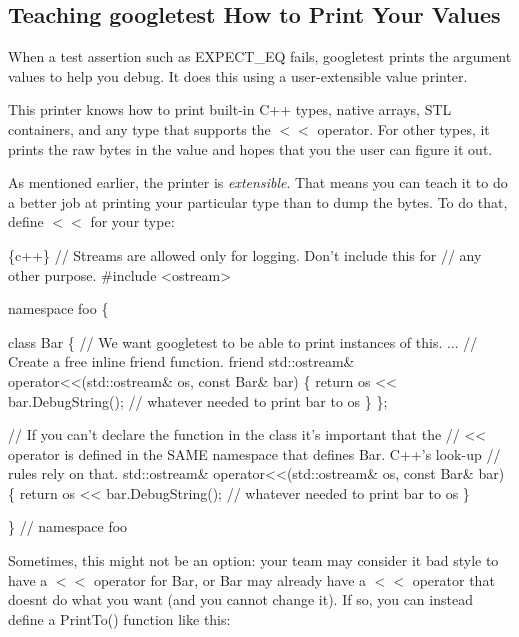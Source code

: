 \subsection*{Teaching googletest How to Print Your Values}

When a test assertion such as {\ttfamily E\+X\+P\+E\+C\+T\+\_\+\+EQ} fails, googletest prints the argument values to help you debug. It does this using a user-\/extensible value printer.

This printer knows how to print built-\/in C++ types, native arrays, S\+TL containers, and any type that supports the {\ttfamily $<$$<$} operator. For other types, it prints the raw bytes in the value and hopes that you the user can figure it out.

As mentioned earlier, the printer is {\itshape extensible}. That means you can teach it to do a better job at printing your particular type than to dump the bytes. To do that, define {\ttfamily $<$$<$} for your type\+:


\begin{DoxyCode}
\{c++\}
// Streams are allowed only for logging.  Don't include this for
// any other purpose.
#include <ostream>

namespace foo \{

class Bar \{  // We want googletest to be able to print instances of this.
...
  // Create a free inline friend function.
  friend std::ostream& operator<<(std::ostream& os, const Bar& bar) \{
    return os << bar.DebugString();  // whatever needed to print bar to os
  \}
\};

// If you can't declare the function in the class it's important that the
// << operator is defined in the SAME namespace that defines Bar.  C++'s look-up
// rules rely on that.
std::ostream& operator<<(std::ostream& os, const Bar& bar) \{
  return os << bar.DebugString();  // whatever needed to print bar to os
\}

\}  // namespace foo
\end{DoxyCode}


Sometimes, this might not be an option\+: your team may consider it bad style to have a {\ttfamily $<$$<$} operator for {\ttfamily Bar}, or {\ttfamily Bar} may already have a {\ttfamily $<$$<$} operator that doesn\textquotesingle{}t do what you want (and you cannot change it). If so, you can instead define a {\ttfamily Print\+To()} function like this\+:


